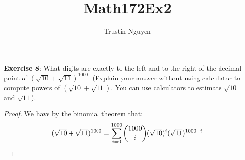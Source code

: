 \documentclass{article}
\title{Math172Ex2}
\author{Trustin Nguyen}
\begin{document}
    \maketitle

\reversemarginpar

\textbf{Exercise 8}: What digits are exactly to the left and to the right of the decimal point of $(\sqrt{10} + \sqrt{11})^{1000}$. (Explain your answer without using calculator to compute powers of $(\sqrt{10} + \sqrt{11})$. You can use calculators to estimate $\sqrt{10}$ and $\sqrt{11}$).
    \begin{proof}
        We have by the binomial theorem that:
            \begin{equation*}
                (\sqrt{10} + \sqrt{11})^{1000} = \sum_{i = 0}^{1000} \dbinom{1000}{i}(\sqrt{10})^{i}(\sqrt{11})^{1000 - i}
            \end{equation*}
    \end{proof}
\end{document}
